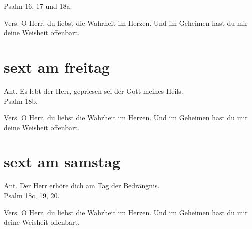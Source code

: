 Psalm 16, 17 und 18a.\\




Vers. O Herr, du liebst die Wahrheit im Herzen. Und im Geheimen hast du mir deine Weisheit offenbart.

\section[]{sext am freitag}



\def\greinitialformat#1{{\fontsize{40}{40}\selectfont #1}}
\def\greinitialformat#1{{\fontsize{40}{40}\selectfont #1}}
\gresetfirstlineaboveinitial{\small \textcolor{red}{Ps  18b }}{}
\setaboveinitialseparation{0.72mm}



Ant. Es lebt der Herr, gepriesen sei der Gott meines Heils.\\

Psalm 18b.\\



Vers. O Herr, du liebst die Wahrheit im Herzen. Und im Geheimen hast du mir deine Weisheit offenbart.


\section[]{sext am samstag}

\def\greinitialformat#1{{\fontsize{40}{40}\selectfont #1}}
\gresetfirstlineaboveinitial{\small \textcolor{red}{ Ps 18c 19 20) }}{}
\setaboveinitialseparation{0.72mm}


Ant. Der Herr erhöre dich am Tag der Bedrängnis.\\

Psalm 18c, 19, 20.\\


Vers. O Herr, du liebst die Wahrheit im Herzen. Und im Geheimen hast du mir deine Weisheit offenbart.
